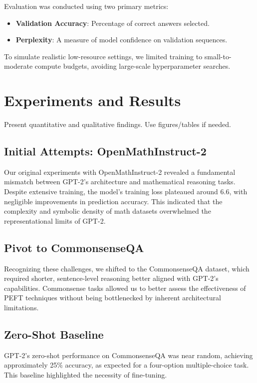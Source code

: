 \documentclass[11pt,twocolumn]{article}
\begin{document}
Evaluation was conducted using two primary metrics:
\begin{itemize}
    \item \textbf{Validation Accuracy}: Percentage of correct answers selected.
    \item \textbf{Perplexity}: A measure of model confidence on validation sequences.
\end{itemize}

To simulate realistic low-resource settings, we limited training to small-to-moderate compute budgets, avoiding large-scale hyperparameter searches.





\section{Experiments and Results}
\label{sec:experiments}
Present quantitative and qualitative findings. Use figures/tables if needed.

\subsection{Initial Attempts: OpenMathInstruct-2}
Our original experiments with OpenMathInstruct-2 revealed a fundamental mismatch between GPT-2’s architecture and mathematical reasoning tasks. Despite extensive training, the model’s training loss plateaued around 6.6, with negligible improvements in prediction accuracy. This indicated that the complexity and symbolic density of math datasets overwhelmed the representational limits of GPT-2.

\subsection{Pivot to CommonsenseQA}
Recognizing these challenges, we shifted to the CommonsenseQA dataset, which required shorter, sentence-level reasoning better aligned with GPT-2’s capabilities. Commonsense tasks allowed us to better assess the effectiveness of PEFT techniques without being bottlenecked by inherent architectural limitations.

\subsection{Zero-Shot Baseline}
GPT-2's zero-shot performance on CommonsenseQA was near random, achieving approximately 25\% accuracy, as expected for a four-option multiple-choice task. This baseline highlighted the necessity of fine-tuning.
\end{document}
